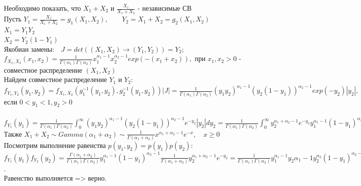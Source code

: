 \documentclass{article}
\begin{document}
Необходимо показать, что $X_1 + X_2$ и $\frac{X_1}{X_1 + X_2}$ - независимые СВ\\
Пусть $Y_1 = \frac{X_1}{X_1 + X_2} = g_1(X_1,X_2), \qquad Y_2 = X_1 + X_2 = g_2(X_1,X_2)$\\
$X_1 = Y_1Y_2$\\
$X_2 = Y_2(1 - Y_1)$\\
Якобиан замены:$\quad J = det((X_1,X_2) \to (Y_1,Y_2)) = Y_2;$\\

$f_{X_1,X_2}(x_1,x_2) = \frac{1}{\Gamma(\alpha_1)\Gamma(\alpha_2)}x_1^{\alpha_1 - 1}x_2^{\alpha_2 - 1}exp(-(x_1+x_2)),$ при $x_1,x_2 > 0$ - совместное распределение $(X_1,X_2)$\\
Найдем совместное распределение $Y_1$ и $Y_2$:\\
$f_{Y_1,Y_2}(y_1,y_2) = f_{X_1,X_2}(g_1^{-1}(y_1,y_2),g_2^{-1}(y_1,y_2))|J| = \frac{1}{\Gamma(\alpha_1)\Gamma(\alpha_2)}(y_1y_2)^{\alpha_1 - 1}(y_2(1-y_1))^{\alpha_2-1}exp(-y_2)|y_2|,$ если $0 < y_1 < 1, y_2 > 0$\\
\\
$f_{Y_1}(y_1) = \frac{1}{\Gamma(\alpha_1)\Gamma(\alpha_2)}\int_0^\infty (y_1y_2)^{\alpha_1 - 1}(y_2(1-y_1))^{\alpha_2 - 1}e^{-y_2}|y_2|dy_2 = \frac{1}{\Gamma(\alpha_1)\Gamma(\alpha_2)}\int_0^\infty y_2^{\alpha_1 + \alpha_2 -1}e^{-y_2}y_1^{\alpha_1 - 1}(1-y_1)^{\alpha_2 - 1}dy_2 = \frac{\Gamma(\alpha_1 + \alpha_2)}{\Gamma(\alpha_1)\Gamma(\alpha_2)}y_1^{\alpha_1 - 1}(1-y_1)^{\alpha_2 - 1}, 0 < y_1 < 1$\\
Также $X_1 + X_2 \sim Gamma(\alpha_1 + \alpha_2) \sim \frac{1}{\Gamma(\alpha_1 + \alpha_2)}x^{\alpha_1 + \alpha_2 - 1}e^{-x}, \quad x \geq 0$\\
Посмотрим выполнение равенства $p(y_1,y_2) = p(y_1)p(y_2):$\\
$f_{Y_1}(y_1)f_{Y_2}(y_2) = \frac{\Gamma(\alpha_1 + \alpha_2)}{\Gamma(\alpha_1)\Gamma(\alpha_2)}y_1^{\alpha_1 - 1}(1 - y_1)^{\alpha_2 - 1}\frac{1}{\Gamma(\alpha_1 + \alpha_2)}y_2^{\alpha_1 + \alpha_2 - 1}e^{-y_2} = \frac{1}{\Gamma(\alpha_1)\Gamma(\alpha_2)}y_1^{\alpha_1 - 1}y_2{\alpha_1 - 1}y_2^{\alpha_2}(1 - y_1)^{\alpha_2 - 1}e^{-y_2}$.\\
Равенство выполняется => верно.
\end{document}
